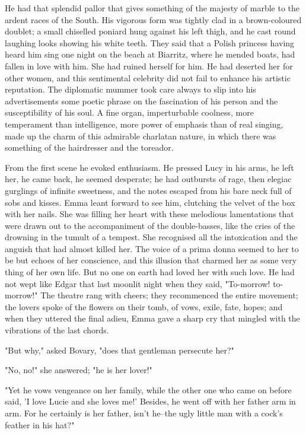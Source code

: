 \documentclass[11pt,twocolumn]{ltugboat}
\begin{document}
He had that splendid pallor that gives something of the majesty of
marble to the ardent races of the South. His vigorous form was tightly
clad in a brown-coloured doublet; a small chiselled poniard hung against
his left thigh, and he cast round laughing looks showing his white
teeth. They said that a Polish princess having heard him sing one night
on the beach at Biarritz, where he mended boats, had fallen in love
with him. She had ruined herself for him. He had deserted her for
other women, and this sentimental celebrity did not fail to enhance his
artistic reputation. The diplomatic mummer took care always to slip into
his advertisements some poetic phrase on the fascination of his
person and the susceptibility of his soul. A fine organ, imperturbable
coolness, more temperament than intelligence, more power of emphasis
than of real singing, made up the charm of this admirable charlatan
nature, in which there was something of the hairdresser and the
toreador.

From the first scene he evoked enthusiasm. He pressed Lucy in his arms,
he left her, he came back, he seemed desperate; he had outbursts of
rage, then elegiac gurglings of infinite sweetness, and the notes
escaped from his bare neck full of sobs and kisses. Emma leant forward
to see him, clutching the velvet of the box with her nails. She was
filling her heart with these melodious lamentations that were drawn
out to the accompaniment of the double-basses, like the cries of the
drowning in the tumult of a tempest. She recognised all the intoxication
and the anguish that had almost killed her. The voice of a prima donna
seemed to her to be but echoes of her conscience, and this illusion that
charmed her as some very thing of her own life. But no one on earth had
loved her with such love. He had not wept like Edgar that last moonlit
night when they said, "To-morrow! to-morrow!" The theatre rang with
cheers; they recommenced the entire movement; the lovers spoke of
the flowers on their tomb, of vows, exile, fate, hopes; and when they
uttered the final adieu, Emma gave a sharp cry that mingled with the
vibrations of the last chords.

"But why," asked Bovary, "does that gentleman persecute her?"

"No, no!" she answered; "he is her lover!"

"Yet he vows vengeance on her family, while the other one who came on
before said, 'I love Lucie and she loves me!' Besides, he went off with
her father arm in arm. For he certainly is her father, isn't he--the
ugly little man with a cock's feather in his hat?"
\end{document}

